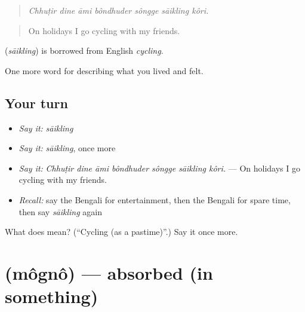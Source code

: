 \begin{quote}
      
\end{quote}

\begin{quote}
\emph{Chhuṭir dine āmi bôndhuder sôngge sāikling kôri.}
\end{quote}

\begin{quote}
On holidays I go cycling with my friends.
\end{quote}

\begin{cousinweb}
\textbf{} (\emph{sāikling}) is borrowed from English \emph{cycling}.
\end{cousinweb}

\begin{grammarlens}[title={What you've built}]
One more word for describing what you lived and felt.
\end{grammarlens}

\subsection*{Your turn}
\begin{itemize}
\raggedright
  \item \emph{Say it:} \emph{sāikling}
  \item \emph{Say it:} \emph{sāikling}, once more
  \item \emph{Say it:} \emph{Chhuṭir dine āmi bôndhuder sôngge sāikling kôri.} — On holidays I go cycling with my friends.
  \item \emph{Recall:} say the Bengali for entertainment, then the Bengali for spare time, then say \emph{sāikling} again
\end{itemize}

\begin{tcolorbox}[breakable,colback=teal!4,colframe=teal!35!black,title={Before you move on}]
What does  mean? (\textquotedblleft{}Cycling (as a pastime)\textquotedblright{}.) Say it once more.
\end{tcolorbox}
\section[\texorpdfstring{\bn{মগ্ন} (môgnô)}{মগ্ন (môgnô)}]{ (môgnô) — absorbed (in something)}

\label{lesson:BN-C516-mogno}



